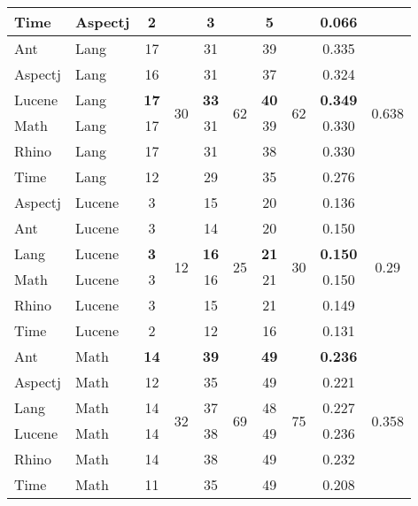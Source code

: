\begin{table*}[t!]
\begin{tabular}{|l|l|c|c|c|c|c|c|c|c|}
    Time  & Aspectj & 2     &       & 3     &       & 5     &       & 0.066 &  \\
    \hline
    Ant   & Lang  & 17    & \multirow{6}[2]{*}{30} & 31    & \multirow{6}[2]{*}{62} & 39    & \multirow{6}[2]{*}{62} & 0.335 & \multirow{6}[2]{*}{0.638} \\
    Aspectj & Lang  & 16    &       & 31    &       & 37    &       & 0.324 &  \\
    Lucene & Lang  & \textbf{17}    &       & \textbf{33}    &       & \textbf{40}    &       & \textbf{0.349} &  \\
    Math  & Lang  & 17    &       & 31    &       & 39    &       & 0.330  &  \\
    Rhino & Lang  & 17    &       & 31    &       & 38    &       & 0.330  &  \\
    Time  & Lang  & 12    &       & 29    &       & 35    &       & 0.276 &  \\
    \hline
    Aspectj   & Lucene & 3     & \multirow{6}[2]{*}{12} & 15    & \multirow{6}[2]{*}{25} & 20    & \multirow{6}[2]{*}{30} & 0.136 & \multirow{6}[2]{*}{0.29} \\
    Ant   & Lucene & 3     & & 14    & & 20 && 0.150 &\\
    Lang  & Lucene & \textbf{3}     &       & \textbf{16}    &       & \textbf{21}    &       & \textbf{0.150}  &  \\
    Math  & Lucene & 3     &       & 16    &       & 21    &       & 0.150  &  \\
    Rhino & Lucene & 3     &       & 15    &       & 21    &       & 0.149 &  \\
    Time  & Lucene & 2     &       & 12    &       & 16    &       & 0.131 &  \\
    \hline
    Ant   & Math  & \textbf{14}    & \multirow{6}[2]{*}{32} & \textbf{39}    &\multirow{6}[2]{*}{69}& \textbf{49}    & \multirow{6}[2]{*}{75}& \textbf{0.236} &\multirow{6}[2]{*}{0.358}  \\
    Aspectj   & Math  & 12    &  & 35    &  & 49    &  & 0.221 &  \\
    Lang  & Math  & 14    &       & 37    &       & 48    &       & 0.227 &  \\
    Lucene & Math  & 14    &       & 38    &       & 49    &       & 0.236 &  \\
    Rhino & Math  & 14    &       & 38    &       & 49    &       & 0.232 &  \\
    Time  & Math  & 11    &       & 35    &       & 49    &       & 0.208 &  \\

\end{tabular}
\end{table*}
